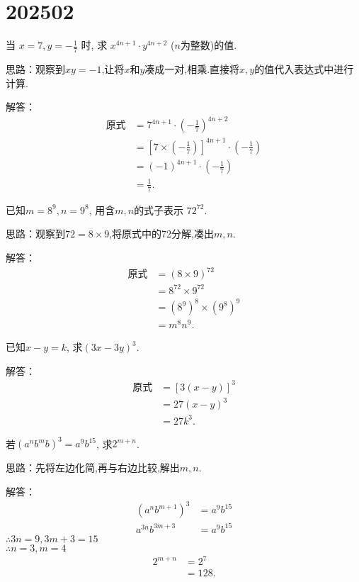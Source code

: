 \section{202502}

\item{
    当 $ x=7, y=-\frac{1}{7}$ 时, 求 $x^{4n+1}\cdot y^{4n+2}$ ($n$为整数)的值.

    \fangsong{}
    思路：观察到$xy=-1$,让将$x$和$y$凑成一对,相乘.直接将$x, y$的值代入表达式中进行计算.
    
    解答：
    \begin{align*}
        \mbox{原式} &= 7^{4n+1}\cdot \left(-\frac{1}{7}\right) ^{4n+2}\\
        &= [7\times(-\frac{1}{7})]^{4n+1} \cdot(-\frac{1}{7})\\
        &= (-1)^{4n+1} \cdot(-\frac{1}{7})\\
        &= \frac{1}{7}.
    \end{align*}
} 
\item{
    已知$ m=8^9, n=9^8 $, 用含$m, n$的式子表示 $72^{72}$.

    \fangsong{}
    思路：观察到$72=8\times 9$,将原式中的72分解,凑出$m, n$.
    
    解答：
    \begin{align*}
        \mbox{原式} &= (8\times 9)^{72}\\
        &= 8^{72}\times 9^{72}\\
        &= (8^9)^8\times (9^8)^9\\
        &= m^8 n^9.
    \end{align*}
} 
\item{
    已知$x-y=k$, 求$(3x-3y)^3.$

    \fangsong{}
    解答：
    \begin{align*}
        \mbox{原式} &= [3(x-y)]^3\\
        &= 27(x-y)^3\\
        &= 27k^3.
    \end{align*}
} 
\item{
    若$(a^nb^mb)^3 = a^9 b^{15}$, 求$2^{m+n}$.

    \fangsong{}
    思路：先将左边化简,再与右边比较,解出$m,n$.
    
    解答：
    \begin{align*}
        (a^nb^{m+1})^3 &= a^9b^{15}\\
        a^{3n}b^{3m+3} &= a^9b^{15}
    \end{align*}
    $\therefore 3n=9, 3m+3=15$\\
    $\therefore n=3, m=4$
    \begin{align*}
        2^{m+n} &= 2^7\\
        &= 128.
    \end{align*}
}
